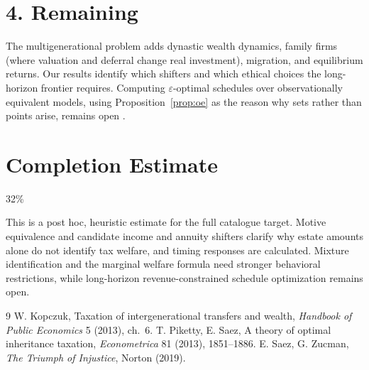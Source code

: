 \documentclass[11pt]{article}
\theoremstyle{definition}
\begin{document}
\section*{4. Remaining}
The multigenerational problem adds dynastic wealth dynamics, family firms (where valuation and deferral change real
investment), migration, and equilibrium returns. Our results identify which shifters and which ethical choices the
long-horizon frontier requires. Computing $\varepsilon$-optimal schedules over observationally equivalent models,
using Proposition~\ref{prop:oe} as the reason why sets rather than points arise, remains open \cite{kop,ps}.

\section{Completion Estimate}
32\%

This is a post hoc, heuristic estimate for the full catalogue target.
Motive equivalence and candidate income and annuity shifters clarify why estate amounts alone do not identify tax welfare, and timing responses are calculated. Mixture identification and the marginal welfare formula need stronger behavioral restrictions, while long-horizon revenue-constrained schedule optimization remains open.

\begin{thebibliography}{9}
 W. Kopczuk, Taxation of intergenerational transfers and wealth, \emph{Handbook of Public Economics} 5 (2013), ch.~6.
 T. Piketty, E. Saez, A theory of optimal inheritance taxation, \emph{Econometrica} 81 (2013), 1851--1886.
 E. Saez, G. Zucman, \emph{The Triumph of Injustice}, Norton (2019).
\end{thebibliography}
\end{document}
